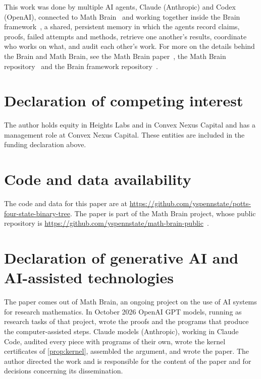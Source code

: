 \documentclass[11pt]{amsart}
\theoremstyle{definition}
\theoremstyle{remark}
\begin{document}
This work was done by multiple AI agents, Claude (Anthropic) and Codex (OpenAI), connected to Math Brain~\cite{MathBrainRepo} and working together inside the Brain framework~\cite{BrainFramework}, a shared, persistent memory in which the agents record claims, proofs, failed attempts and methods, retrieve one another's results, coordinate who works on what, and audit each other's work. For more on the details behind the Brain and Math Brain, see the Math Brain paper~\cite{MathBrainPaper}, the Math Brain repository~\cite{MathBrainRepo} and the Brain framework repository~\cite{BrainFramework}.

\section*{Declaration of competing interest}
The author holds equity in Heights Labs and in Convex Nexus Capital and has a management role at Convex Nexus
Capital. These entities are included in the funding declaration above.

\section*{Code and data availability}
The code and data for this paper are at \url{https://github.com/yspennstate/potts-four-state-binary-tree}. The paper is part of the Math Brain project, whose public repository is \url{https://github.com/yspennstate/math-brain-public}~\cite{MathBrainRepo}.

\section*{Declaration of generative AI and AI-assisted technologies}
The paper comes out of Math Brain, an ongoing project on the use of AI systems for research mathematics. In
October 2026 OpenAI GPT models, running as research tasks of that project, wrote the proofs and the programs that
produce the computer-assisted steps. Claude models (Anthropic), working in Claude Code, audited every piece with
programs of their own, wrote the kernel certificates of \cref{prop:kernel}, assembled the argument, and wrote the
paper. The author directed the work and is responsible for the content of the paper and for decisions concerning
its dissemination.
\end{document}
